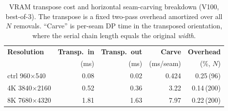 \begin{table}[h!]
\caption{VRAM transpose cost and horizontal seam-carving breakdown (V100,
best-of-3). The transpose is a fixed two-pass overhead amortized over all $N$
removals. ``Carve'' is per-seam DP time in the transposed orientation, where the
serial chain length equals the original \emph{width}.}
\label{tab:transpose}
\centering
\begin{tabular}{@{}lrrrr@{}}
\toprule
\textbf{Resolution} & \textbf{Transp.\ in} & \textbf{Transp.\ out} &
\textbf{Carve} & \textbf{Overhead} \\
 & (ms) & (ms) & (ms/seam) & (\%, $N$) \\
\midrule
ctrl 960$\times$540   & 0.08 & 0.02 & 0.424 & 0.25\,(96)  \\
4K 3840$\times$2160   & 0.52 & 0.36 & 3.22  & 0.14\,(200) \\
8K 7680$\times$4320   & 1.81 & 1.63 & 7.97  & 0.22\,(200) \\
\bottomrule
\end{tabular}
\end{table}
